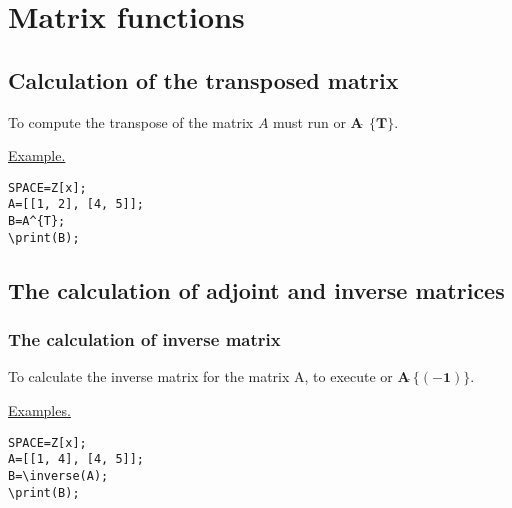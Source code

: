\chapter{Matrix functions}
\section{Calculation of the transposed matrix}

To compute the transpose of the matrix $ A $ must run 
   or $ \mathbf {A \widehat {\ }\ \{T \} } $.

\underline{Example. }

\vspace*{-2mm}
\begin{verbatim}
SPACE=Z[x]; 
A=[[1, 2], [4, 5]];
B=A^{T}; 
\print(B);
\end{verbatim}
 

\section{The calculation of adjoint and inverse matrices} 
\subsection{The calculation of inverse matrix} 

To calculate the inverse matrix for the matrix A, to execute  
  or $\mathbf{A\widehat{\ } \{(-1)\}}$. 

\underline{Examples. }

\vspace*{-2mm}
\begin{verbatim}
SPACE=Z[x]; 
A=[[1, 4], [4, 5]];
B=\inverse(A); 
\print(B);
\end{verbatim}

